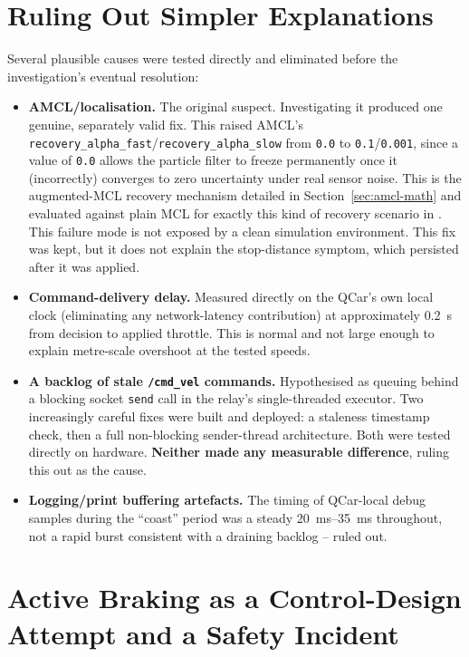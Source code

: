 \section{Ruling Out Simpler Explanations}
\label{sec:ruled-out}

Several plausible causes were tested directly and eliminated before
the investigation's eventual resolution:

\begin{itemize}
  \item \textbf{AMCL/localisation.} The original suspect. Investigating
    it produced one genuine, separately valid fix. This raised AMCL's
    \texttt{recovery\_alpha\_fast}/\texttt{recovery\_alpha\_slow} from
    \texttt{0.0} to \texttt{0.1}/\texttt{0.001}, since a value of
    \texttt{0.0} allows the particle filter to freeze permanently once
    it (incorrectly) converges to zero uncertainty under real sensor
    noise. This is the augmented-MCL recovery mechanism detailed in
    Section~\ref{sec:amcl-math} and evaluated against plain MCL for
    exactly this kind of recovery scenario in
    \cite{thrun2001robustmcl}. This failure mode is not exposed by a
    clean simulation environment. This fix was kept, but it does not
    explain the stop-distance symptom, which persisted after it was
    applied.
  \item \textbf{Command-delivery delay.} Measured directly on the
    QCar's own local clock (eliminating any network-latency
    contribution) at approximately \SI{0.2}{\second} from decision to
    applied throttle. This is normal and not large enough to explain
    metre-scale overshoot at the tested speeds.
  \item \textbf{A backlog of stale \texttt{/cmd\_vel} commands.}
    Hypothesised as queuing behind a blocking socket \texttt{send}
    call in the relay's single-threaded executor. Two increasingly
    careful fixes were built and deployed: a staleness timestamp
    check, then a full non-blocking sender-thread architecture. Both
    were tested directly on hardware. \textbf{Neither made any
    measurable difference}, ruling this out as the cause.
  \item \textbf{Logging/print buffering artefacts.} The timing of
    QCar-local debug samples during the ``coast'' period was a steady
    \SIrange{20}{35}{\milli\second} throughout, not a rapid burst
    consistent with a draining backlog -- ruled out.
\end{itemize}

\section{Active Braking as a Control-Design Attempt and a Safety Incident}
\label{sec:active-braking}

